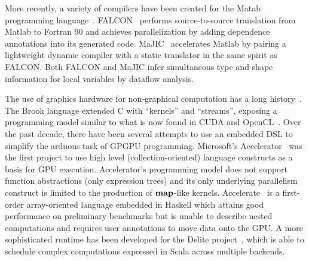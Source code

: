 \documentclass[10pt,twocolumn]{article}
\begin{document}
More recently, a variety of compilers have been created for the Matab programming language~\cite{Moler80}. FALCON~\cite{DeRose95} performs source-to-source translation from Matlab to Fortran 90 and achieves parallelization by adding dependence annotations into its generated code. MaJIC~\cite{Alma02} accelerates Matlab by pairing a lightweight dynamic compiler with a static translator in the same spirit as FALCON. Both FALCON and MaJIC infer simultaneous type and shape information for local variables by dataflow analysis.

The use of graphics hardware for non-graphical computation has a long history~\cite{Leng90}. The Brook language extended C with ``kernels'' and ``streams'', exposing a programming model similar to what is now found in CUDA and OpenCL~\cite{Buck04}.  Over the past decade, there have been several attempts to use an embedded DSL to simplify the arduous task of GPGPU programming. Microsoft's Accelerator~\cite{Tard06} was the first project to use high level (collection-oriented) language constructs as a basis for GPU execution. Accelerator's programming model does not support function abstractions (only expression trees) and its only underlying parallelism construct is limited to the production of $\mbox{\textbf{map}}$-like kernels.  Accelerate~\cite{Chak11} is a first-order array-oriented language embedded in Haskell which attains good performance on preliminary benchmarks but is unable to describe nested computations and requires user annotations to move data onto the GPU. A more sophisticated runtime has been developed for the Delite project~\cite{Brown11}, which is able to schedule complex computations expressed in Scala across multiple backends. 
\end{document}
